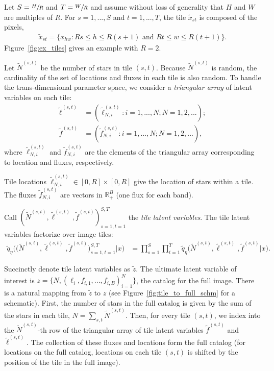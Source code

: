 Let $S = \sfrac{H}{R}$ and $T = \sfrac{W}{R}$ and assume without loss of generality that $H$ and $W$ are multiples of $R$.
For $s = 1, ..., S$ and $t = 1, ..., T$,
the tile $\tilde x_{st}$ is composed of the pixels,
\begin{align}
    \tilde x_{st} = \{x_{hw} : Rs \leq h \leq R(s+1) \text{ and } Rt \leq w \leq R(t+1)\}.
    \label{eq:tiles}
\end{align}
Figure~\ref{fig:ex_tiles} gives an example with $R = 2$. 

Let $\tilde N^{(s, t)}$ be the number of stars in tile $(s,t)$.
Because $\tilde N^{(s, t)}$ is random, 
the cardinality of the set of locations and fluxes in each tile
is also random. 
To handle the trans-dimensional parameter space, 
we consider a {\itshape triangular array} of latent variables
on each tile:
\begin{align}
    \tilde\ell^{(s, t)} &= (\tilde\ell_{N, i}^{(s, t)} : i = 1, ..., N; N = 1, 2, ...); \\
    \tilde f^{(s, t)} &= (\tilde f_{N, i}^{(s, t)} : i = 1, ..., N; N = 1, 2, ...),
\end{align}
where $\tilde\ell_{N, i}^{(s, t)}$ and $\tilde f_{N, i}^{(s, t)}$ are the elements of the triangular array corresponding to location and fluxes, respectively. 

Tile locations $\tilde\ell_{N, i}^{(s, t)} \in [0, R]\times[0, R]$ give the location of stars within a tile. The fluxes $\tilde f_{N, i}^{(s, t)}$ are vectors in $\mathbb{R}^B_+$ (one flux for each band). 

Call $(\tilde N^{(s, t)}, \tilde \ell^{(s, t)}, \tilde f^{(s, t)})_{s=1,t=1}^{S,T}$ the {\itshape tile latent variables}. The tile latent variables factorize over image tiles:
\begin{align}
    \tilde q_\eta\big( \big(\tilde N^{(s, t)}, \tilde \ell^{(s, t)}, \tilde f^{(s, t)}\big)_{s=1, t = 1}^{S, T}|x\big) 
    &=
    \prod_{s = 1}^S \prod_{t=1}^T
    \tilde q_\eta\big(\tilde N^{(s, t)}, \tilde \ell^{(s, t)}, \tilde f^{(s, t)} | x\big).
    \label{eq:factorize_patches}
\end{align}

Succinctly denote tile latent variables as $\tilde z$.
The ultimate latent variable of interest is $z = \{N, (\ell_i, f_{i,1}, ..., f_{i,B})_{i = 1}^N\}$, the catalog for the full image.
There is a natural mapping from $\tilde z$ to $z$
(see Figure~\ref{fig:tile_to_full_schm} for a schematic). 
First, the number of stars in the full catalog is given by the sum of the stars in each tile, $N = \sum_{s,t} \tilde N^{(s, t)}$. 
Then, for every tile $(s,t)$, we index into the $\tilde N^{(s,t)}$-th row of the triangular array of tile latent variables $\tilde f^{(s,t)}$ and $\tilde \ell^{(s,t)}$. 
The collection of these fluxes and locations form the full catalog (for locations on the full catalog, locations on each tile $(s,t)$ is shifted by the position of the tile in the full image). 


